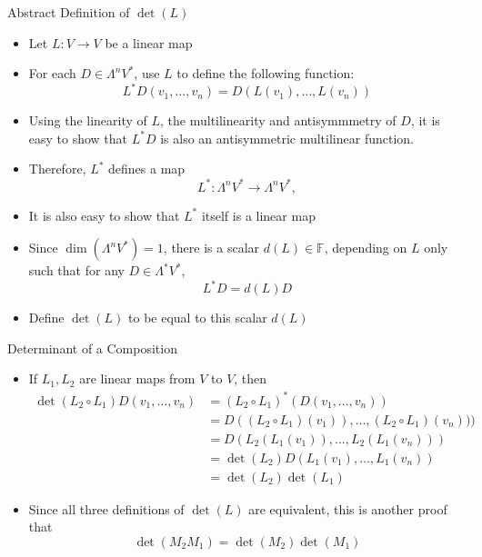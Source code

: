 \documentclass[usenames,dvipsnames,10pt]{beamer}
\newcommand\F{\mathbb{F}}
\begin{document}
\begin{frame}
  {Abstract Definition of $\det(L)$}

  \begin{itemize}
  \item Let $L: V \rightarrow V$ be a linear map
  \item For each $D \in \Lambda^nV^*$, use $L$ to define the following function:
    \[
      L^*D(v_1, \dots, v_n) = D(L(v_1), \dots, L(v_n))
    \]
  \item Using the linearity of $L$, the multilinearity and antisymmmetry of $D$, it is easy to show that $L^*D$ is also an antisymmetric multilinear function.
  \item Therefore, $L^*$ defines a map
    \[
      L^*: \Lambda^nV^* \rightarrow \Lambda^nV^*,
    \]
  \item It is also easy to show that $L^*$ itself is a linear map
  \item Since $\dim(\Lambda^nV^*) = 1$, there is a scalar $d(L)\in \F$, depending on $L$ only such that for any $D \in \Lambda^*V^*$,
    \[
      L^*D = d(L)D
    \]
  \item Define $\det(L)$ to be equal to this scalar $d(L)$
  \end{itemize}
\end{frame}

\begin{frame}
  {Determinant of a Composition}

  \begin{itemize}
  \item If $L_1, L_2$ are linear maps from $V$ to $V$, then
    \begin{align*}
      \det(L_2\circ L_1)D(v_1, \dots, v_n) &= (L_2\circ L_1)^*(D(v_1, \dots, v_n))\\
                                           &= D((L_2\circ L_1)(v_1)), \dots, (L_2\circ L_1)(v_n)))\\
                                           &= D(L_2(L_1(v_1)), \dots, L_2(L_1(v_n)))\\
                                           &= \det(L_2)D(L_1(v_1), \dots, L_1(v_n))\\
                                           &=  \det(L_2)\det(L_1)
    \end{align*}
  \item Since all three definitions of $\det(L)$ are equivalent, this is another proof that
    \[
      \det(M_2M_1) = \det(M_2)\det(M_1)
    \]
  \end{itemize}
\end{frame}
\end{document}
